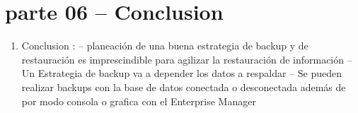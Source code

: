 \section{parte 06 – Conclusion} 

\begin{enumerate}[1.]
	\item Conclusion :
	\subitem   -- planeación de una buena estrategia de backup y de restauración es imprescindible para agilizar la restauración de información
	\subitem   -- Un Estrategia de backup va a depender los datos a respaldar
	\subitem   -- Se pueden realizar backups con la base de datos conectada o desconectada además de por modo consola o grafica con el Enterprise Manager

	


	
	

\end{enumerate} 

